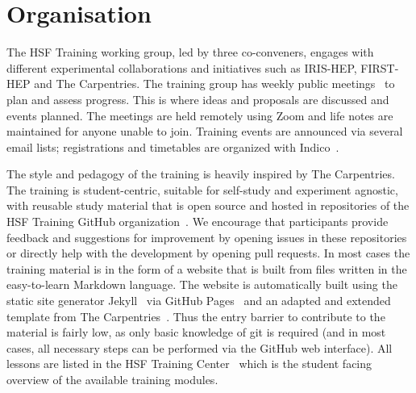 \documentclass[twocolumn]{svjour3}          %
\begin{document}
\section{Organisation }\label{sec:Organisation}
%
The HSF Training working group, led by three co-conveners, engages with different experimental collaborations and initiatives such as IRIS-HEP, FIRST-HEP and The Carpentries. The training group has weekly public meetings~\cite{HSF-training-meetings} to plan and assess progress. This is where ideas and proposals are discussed and events planned. The meetings are held remotely using Zoom and life notes are maintained for anyone unable to join. Training events are announced via several email lists; registrations and timetables are organized with  Indico~\cite{HSF-training-events}.

The style and pedagogy of the training is heavily inspired by The Carpentries.
The training is student-centric, suitable for self-study and experiment agnostic, with reusable study material that is open source and hosted in repositories of the HSF Training GitHub organization~\cite{HSF-training-materials}. We encourage that participants provide feedback and suggestions for improvement by opening issues in these repositories or directly help with the development by opening pull requests.
In most cases the training material is in the form of a website that is built from files written in the easy-to-learn Markdown language. The website is automatically built using the static site generator Jekyll~\cite{jekyll} via GitHub Pages~\cite{github-pages} and an adapted and extended template from The Carpentries~\cite{hsf-styles,carpentry-styles}. Thus the entry barrier to contribute to the material is fairly low, as only basic knowledge of git is required (and in most cases, all necessary steps can be performed via the GitHub web interface).
All lessons are listed in the HSF Training Center~\cite{HSF-curriculum} which is the student facing overview of the available training modules.
\end{document}
